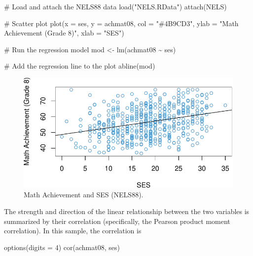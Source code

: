 \documentclass[
  letterpaper,
  DIV=11,
  numbers=noendperiod]{scrreprt}
\newenvironment{Shaded}{\begin{snugshade}}{\end{snugshade}}
\newcommand{\AttributeTok}[1]{\textcolor[rgb]{0.40,0.45,0.13}{#1}}
\newcommand{\CommentTok}[1]{\textcolor[rgb]{0.37,0.37,0.37}{#1}}
\newcommand{\DecValTok}[1]{\textcolor[rgb]{0.68,0.00,0.00}{#1}}
\newcommand{\FunctionTok}[1]{\textcolor[rgb]{0.28,0.35,0.67}{#1}}
\newcommand{\NormalTok}[1]{\textcolor[rgb]{0.00,0.23,0.31}{#1}}
\newcommand{\OtherTok}[1]{\textcolor[rgb]{0.00,0.23,0.31}{#1}}
\newcommand{\SpecialCharTok}[1]{\textcolor[rgb]{0.37,0.37,0.37}{#1}}
\newcommand{\StringTok}[1]{\textcolor[rgb]{0.13,0.47,0.30}{#1}}
\begin{document}
\begin{Shaded}
\begin{Highlighting}[]
\CommentTok{\# Load and attach the NELS88 data}
\FunctionTok{load}\NormalTok{(}\StringTok{"NELS.RData"}\NormalTok{)}
\FunctionTok{attach}\NormalTok{(NELS)}

\CommentTok{\# Scatter plot}
\FunctionTok{plot}\NormalTok{(}\AttributeTok{x =}\NormalTok{ ses, }\AttributeTok{y =}\NormalTok{ achmat08, }\AttributeTok{col =} \StringTok{"\#4B9CD3"}\NormalTok{, }\AttributeTok{ylab =} \StringTok{"Math Achievement (Grade 8)"}\NormalTok{, }\AttributeTok{xlab =} \StringTok{"SES"}\NormalTok{)}

\CommentTok{\# Run the regression model}
\NormalTok{mod }\OtherTok{\textless{}{-}} \FunctionTok{lm}\NormalTok{(achmat08 }\SpecialCharTok{\textasciitilde{}}\NormalTok{ ses)}

\CommentTok{\# Add the regression line to the plot}
\FunctionTok{abline}\NormalTok{(mod) }
\end{Highlighting}
\end{Shaded}

\begin{figure}[H]

{\centering \includegraphics{ch2_simple_regression_files/figure-pdf/fig1-1.pdf}

}

\caption{Math Achievement and SES (NELS88).}

\end{figure}

The strength and direction of the linear relationship between the two
variables is summarized by their correlation (specifically, the Pearson
product moment correlation). In this sample, the correlation is

\begin{Shaded}
\begin{Highlighting}[]
\FunctionTok{options}\NormalTok{(}\AttributeTok{digits =} \DecValTok{4}\NormalTok{)}
\FunctionTok{cor}\NormalTok{(achmat08, ses)}
\end{Highlighting}
\end{Shaded}
\end{document}
